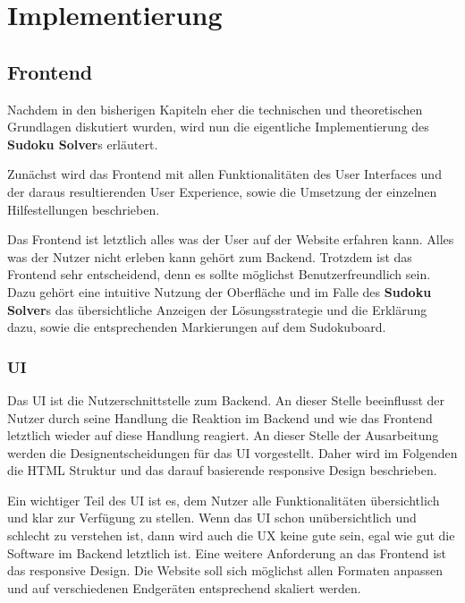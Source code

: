 
\part{Implementierung}

\chapter{Frontend}
Nachdem in den bisherigen Kapiteln eher die technischen und theoretischen Grundlagen diskutiert wurden, wird nun die eigentliche Implementierung des \textbf{Sudoku Solver}s erläutert.

Zunächst wird das Frontend mit allen Funktionalitäten des User Interfaces und der daraus resultierenden User Experience, sowie die Umsetzung der einzelnen Hilfestellungen beschrieben.

Das Frontend ist letztlich alles was der User auf der Website erfahren kann. Alles was der Nutzer nicht erleben kann gehört zum Backend. Trotzdem ist das Frontend sehr entscheidend, denn es sollte möglichst Benutzerfreundlich sein. Dazu gehört eine intuitive Nutzung der Oberfläche und im Falle des \textbf{Sudoku Solver}s das übersichtliche Anzeigen der Lösungsstrategie und die Erklärung dazu, sowie die entsprechenden Markierungen auf dem Sudokuboard.

\section{\acl{UI}}
Das \ac{UI} ist die Nutzerschnittstelle zum Backend. An dieser Stelle beeinflusst der Nutzer durch seine Handlung die Reaktion im Backend und wie das Frontend letztlich wieder auf diese Handlung reagiert. An dieser Stelle der Ausarbeitung werden die Designentscheidungen für das \ac{UI} vorgestellt. Daher wird im Folgenden die \ac{HTML} Struktur und das darauf basierende responsive Design beschrieben.

Ein wichtiger Teil des \ac{UI} ist es, dem Nutzer alle Funktionalitäten übersichtlich und klar zur Verfügung zu stellen. Wenn das \ac{UI} schon unübersichtlich und schlecht zu verstehen ist, dann wird auch die \acs{UX} keine gute sein, egal wie gut die Software im Backend letztlich ist. Eine weitere Anforderung an das Frontend ist das responsive Design. Die Website soll sich möglichst allen Formaten anpassen und auf verschiedenen Endgeräten entsprechend skaliert werden.

